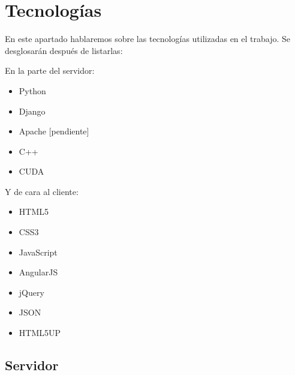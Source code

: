 \newpage
\section{Tecnologías}

En este apartado hablaremos sobre las tecnologías utilizadas en el trabajo. Se desglosarán después de listarlas:

\bigskip
En la parte del servidor:
\begin{itemize}
	\item Python
	\item Django
	\item Apache      [pendiente]
	\item C++
	\item CUDA
\end{itemize}

Y de cara al cliente:
\begin{itemize}
	\item HTML5
	\item CSS3
	\item JavaScript
	\item AngularJS
	\item jQuery
	\item JSON
	\item HTML5UP
\end{itemize}

\bigskip
\subsection{Servidor}
\bigskip

